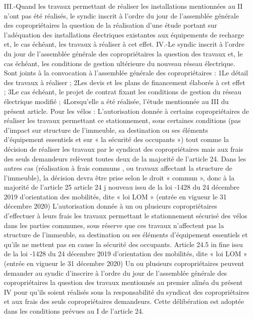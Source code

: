 				III.-Quand les travaux permettant de réaliser les installations mentionnées au II n'ont pas été réalisés, le syndic inscrit à l'ordre du jour de l'assemblée générale des copropriétaires la question de la réalisation d'une étude portant sur l'adéquation des installations électriques existantes aux équipements de recharge et, le cas échéant, les travaux à réaliser à cet effet.
				IV.-Le syndic inscrit à l'ordre du jour de l'assemblée générale des copropriétaires la question des travaux et, le cas échéant, les conditions de gestion ultérieure du nouveau réseau électrique.
				Sont joints à la convocation à l'assemblée générale des copropriétaires :
				1\degres Le détail des travaux à réaliser ;
				2\degres Les devis et les plans de financement élaborés à cet effet ;
				3\degres Le cas échéant, le projet de contrat fixant les conditions de gestion du réseau électrique modifié ;
				4\degres Lorsqu'elle a été réalisée, l'étude mentionnée au III du présent article.
				Pour les vélos :
				L’autorisation donnée à certains copropriétaires de réaliser les travaux permettant ce stationnement, sous certaines conditions (pas d’impact sur structure de l'immeuble, sa destination ou ses éléments d'équipement essentiels et sur « la sécurité des occupants ») tout comme la décision de réaliser les travaux par le syndicat des copropriétaires mais aux frais des seuls demandeurs relèvent toutes deux de la majorité de l’article 24.
				Dans les autres cas (réalisation à frais communs , ou travaux affectant la structure de l’immeuble), la décision devra être prise selon le droit « commun », donc à la majorité de l’article 25
				article 24 j nouveau issu de la loi -1428 du 24 décembre 2019 d’orientation des mobilités, dite « loi LOM » (entrée en vigueur le 31 décembre 2020)
				L'autorisation donnée à un ou plusieurs copropriétaires d'effectuer à leurs frais les travaux permettant le stationnement sécurisé des vélos dans les parties communes, sous réserve que ces travaux n'affectent pas la structure de l'immeuble, sa destination ou ses éléments d'équipement essentiels et qu'ils ne mettent pas en cause la sécurité des occupants.
				Article 24.5 in fine issu de la loi -1428 du 24 décembre 2019 d’orientation des mobilités, dite « loi LOM » (entrée en vigueur le 31 décembre 2020)
				Un ou plusieurs copropriétaires peuvent demander au syndic d'inscrire à l'ordre du jour de l'assemblée générale des copropriétaires la question des travaux mentionnés au premier alinéa du présent IV pour qu'ils soient réalisés sous la responsabilité du syndicat des copropriétaires et aux frais des seuls copropriétaires demandeurs. Cette délibération est adoptée dans les conditions prévues au I de l'article 24.
